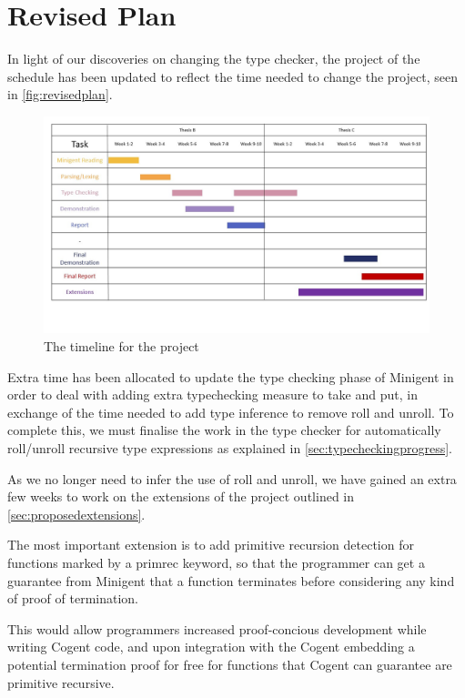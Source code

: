 \chapter{Revised Plan}\label{ch:plan}

In light of our discoveries  on changing the type checker,
the project of the schedule has been updated to reflect the time needed to change the project,
seen in \autoref{fig:revisedplan}.

\begin{figure}
    \centering
    \includegraphics[height=0.50\textheight, angle=90]{content/revised_plan.jpg}
    \caption{The timeline for the project}
    \label{fig:revisedplan}
\end{figure}

Extra time has been allocated to update the type checking phase of Minigent in order to deal with
adding extra typechecking measure to \textsf{take} and \textsf{put}, in exchange of the time
needed to add type inference to remove \textsf{roll} and \textsf{unroll}. To complete this,
we must finalise the work in the type checker for automatically \textsf{roll}/\textsf{unroll} recursive type expressions
as explained in \autoref{sec:typecheckingprogress}.

As we no longer need to infer the use of \textsf{roll} and \textsf{unroll}, we have gained an extra
few weeks to work on the extensions of the project outlined in \autoref{sec:proposedextensions}.

The most important extension is to add primitive recursion detection for functions marked by
a \textsf{primrec} keyword, so that the programmer can get a guarantee from Minigent that
a function terminates before considering any kind of proof of termination.

This would allow programmers increased proof-concious development while writing Cogent code,
and upon integration with the Cogent embedding a potential termination proof for free for
functions that Cogent can guarantee are primitive recursive.

